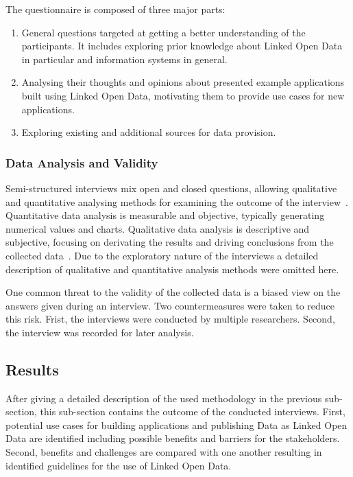 \documentclass{article}
\begin{document}
The questionnaire is composed of three major parts:
\begin{enumerate}
	\item General questions targeted at getting a better understanding of the participants. It includes exploring prior knowledge about Linked Open Data in particular and information systems in general. 
	\item Analysing their thoughts and opinions about presented example applications built using Linked Open Data, motivating them to provide use cases for new applications. 
	\item Exploring existing and additional sources for data provision. 
\end{enumerate}


\subsubsection{Data Analysis and Validity}
Semi-structured interviews mix open and closed questions, allowing qualitative and quantitative analysing methods for examining the outcome of the interview~\cite{article:runeson2009-interview-guidelines}. Quantitative data analysis is measurable and objective, typically generating numerical values and charts. Qualitative data analysis is descriptive and subjective, focusing on derivating the results and driving conclusions from the collected data~\cite{article:yin2003case-case-study-research-and-design}. Due to the exploratory nature of the interviews a detailed description of qualitative and quantitative analysis methods were omitted here.  

One common threat to the validity of the collected data is a biased view on the answers given during an interview. Two countermeasures were taken to reduce this risk. Frist, the interviews were conducted by multiple researchers. Second, the interview was recorded for later analysis. 

\subsection{Results}
After giving a detailed description of the used methodology in the previous sub-section, this sub-section contains the outcome of the conducted interviews. First, potential use cases for building applications and publishing Data as Linked Open Data are identified including possible benefits and barriers for the stakeholders. Second, benefits and challenges are compared with one another resulting in identified guidelines for the use of Linked Open Data. 
\end{document}
